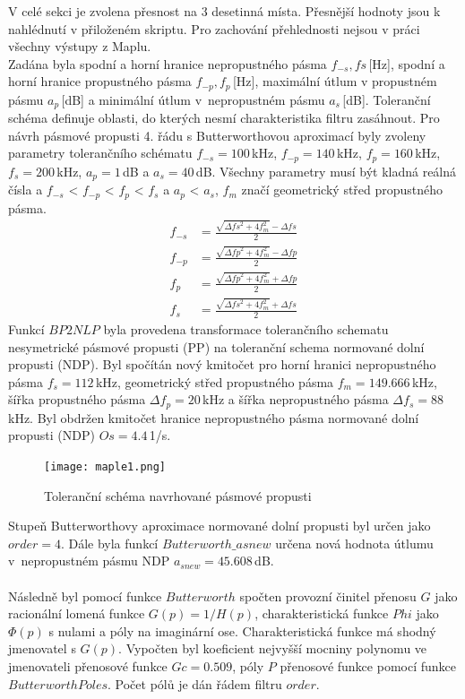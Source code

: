 V celé sekci je zvolena přesnost na 3 desetinná místa. Přesnější hodnoty jsou k nahlédnutí v přiloženém skriptu. Pro zachování přehlednosti nejsou v práci všechny výstupy z Maplu.\\
Zadána byla spodní a horní hranice nepropustného pásma $f_{-s},fs$\,[Hz], spodní a horní hranice propustného pásma $f_{-p},f_p$\,[Hz], maximální útlum v propustném pásmu $a_p$\,[dB] a minimální útlum v~nepropustném pásmu $a_s$\,[dB]. Toleranční schéma definuje oblasti, do kterých nesmí charakteristika filtru zasáhnout. Pro návrh pásmové propusti 4. řádu s Butterworthovou aproximací byly zvoleny parametry tolerančního schématu $f_{-s} = 100$\,kHz, $f_{-p} = 140$\,kHz, $f_p = 160$\,kHz, $f_s = 200$\,kHz, $a_p = 1$\,dB a $a_s = 40$\,dB. Všechny parametry musí být kladná reálná čísla a $f_{-s}$ <  $f_{-p}$ < $f_p$ < $f_s$ a $a_p$ < $a_s$, $f_m$ značí geometrický střed propustného pásma.
\begin{align}
f_{-s} &= \frac{\sqrt{\Delta{fs}^2+4f_m ^2}-\Delta{fs}}{2}\\
f_{-p} &= \frac{\sqrt{\Delta{fp}^2+4f_m ^2}-\Delta{fp}}{2}\\
f_p &= \frac{\sqrt{\Delta{fp}^2+4f_m ^2}+\Delta{fp}}{2}\\
f_s &= \frac{\sqrt{\Delta{fs}^2+4f_m ^2}+\Delta{fs}}{2}
\end{align}
Funkcí $BP2NLP$ byla provedena transformace tolerančního schematu nesymetrické pásmové propusti (PP) na toleranční schema normované dolní propusti (NDP). Byl spočítán nový kmitočet pro horní hranici nepropustného pásma $f_s = 112$\,kHz, geometrický střed propustného pásma $f_m = 149.666$\,kHz, šířka propustného pásma $\Delta{f_p} = 20$\,kHz a šířka nepropustného pásma $\Delta{f_s} = 88$\,kHz. Byl obdržen kmitočet hranice nepropustného pásma normované dolní propusti (NDP) $Os = 4.4$\,1/s.
\begin{figure}[h]
\centering
\texttt{[image: maple1.png]}
\caption{Toleranční schéma navrhované pásmové propusti}
\end{figure}
\noindent Stupeň Butterworthovy aproximace normované dolní propusti byl určen jako $order = 4$.
\noindent Dále byla funkcí $Butterworth\_asnew$ určena nová hodnota útlumu v~nepropustném pásmu NDP $a_{snew} = 45.608$\,dB.\\
\\
Následně byl pomocí funkce $Butterworth$ spočten provozní činitel přenosu $G$ jako racionální lomená funkce $G(p) = 1/H(p)$, charakteristická funkce $Phi$ jako $\Phi(p)$ s nulami a póly na imaginární ose. Charakteristická funkce má shodný jmenovatel s $G(p)$. Vypočten byl koeficient nejvyšší mocniny polynomu ve jmenovateli přenosové funkce $Gc = 0.509$, póly $P$ přenosové funkce pomocí funkce $ButterworthPoles$. Počet pólů je dán řádem filtru $order$.
